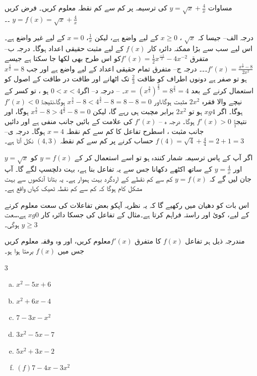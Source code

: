 مساوات \( y=\sqrt{x}+\frac{4}{x} \) کی ترسیمہ پر کم سے کم نقطہ معلوم کریں۔
فرض کریں \( y=f(x)=\sqrt{x}+\frac{4}{x} \)		۔۔

درجہ الف-- جیسا کہ $ \sqrt{x}$		،	  $ x\geq0$	کے لیے واضع ہے، لیکن 	$ \frac{1}{x} $،	  $x=0 $	کے لیے غیر واضع ہے۔ اس لیے سب سے بڑا ممکنہ دائرہ کار 	   \(f(x)\)   	کے لیے مثبت حقیقی اعداد ہوگا۔
درجہ ب--متفرق	$ f'(x)=\frac{1}{2} x^{\frac{-1}{2}} -4x^{-2}$کو اس طرح بھی لکھا جا سکتا ہے جیسے  $f'(x)=\frac{x^{\frac{3}{2}}-8}{2x^{2}} $۔۔۔
درجہ ج-- متفرق تمام حقیقی اعداد کے لیے واضع ہے اور جب $ x^{\frac{3}{2}}=8 $ ہو تو صفر ہے دونوں اطراف کو طاقت  $\frac{2}{3} $		 تک اٹھانے اور طاقت در طاقت کے اصول کو استعمال کرنے کے بعد    $ x=(x^{\frac{3}{2}})^{\frac{2}{3}}=8^{\frac{2}{3}}=4 $۔
--
درجہ د-- اگر$ 0<x<4 $ ہو ، تو کسر کے نیچے والا فقرہ 	   $2x^{2} $	مثبت ہوگا،اور    $x^{\frac{3}{2}}-8<4^{\frac{3}{2}}-8=8-8=0 $   ہوگا،نتیجۃً	 $f'(x)<0 $	ہوگا۔ 
اگر 	\( xg4\) ہو تو 	$2x^{2} $ برابر مچبت ہی رہے گا، لیکن $x^{\frac{3}{2}}-8>4^{\frac{3}{2}}-8=0 $ ہوگا، اور نتیجۃًٍٍ \( f'(x)>0 \) ہوگا۔
درجہ ہ --  \(f\prime(x)\) کی علامت   کے بائیں جانب منفی ہے اور دائیں جانب مثبت ، اسطرح تفاعل کا کم سے کم نقطہ $ x=4 $  ہوگا۔
درجہ ی-- 		 $ f(4)=\sqrt{4}+\frac{4}{4}=2+1=3 $	حساب کرنے پر کم سے کم نقطہ 	\(  (4,3)\)	 نکل آتا ہے۔

اگر آپ کے پاس ترسیمہ شمار کنندہ ہو تو اسے استعمال کر کے \(y=f(x) \) کو  \(y=\sqrt{x} \) اور  \(y=\frac{4}{x} \)  کے ساتھ اکٹھے دکھانا جس سے یہ تفاعل بنا ہے، بہت دلچسپ لگے گا۔ آپ جان لیں گے کہ \(y=f(x) \)  کم سے کم نقطے کے اردگرد بہت ہموار ہے۔ یہ بتانا آنکھوں سے بہت مشکل کام ہوگا کہ کم سے کم نقطہ ٹھیک کہاں واقع ہے۔

اس بات کو دھیان میں رکھیے گا کہ یہ نظریہ آپکو بعض تفاعلات کی سعت معلوم کرنے کے لیے، کوئ اور راستہ فراہم کرتا ہے۔مثال  کے تفاعل کی جسکا دائرہ کار 	\( xg0\)	 ہے،سعت 	\( y\ge 3\) ہوگی۔

مندرجہ ذیل ہر تفاعل 	\(f(x)\) 	کا متفرق \( f\prime (x)\)معلوم کریں، اور وہ وقفہ معلوم کریں جس میں 		  \(f(x)\)   برھتا ہوا ہو۔ 
\begin{multicols}{3}
\begin{enumerate}[a.]
\item \(x^{2}-5x+6 \hspace{50pt}\)
\item  \(x^{2}+6x-4 \hspace{50pt}\)
\item   \(7-3x-x^{2} \)
\item    \(3x^{2}-5x-7 \hspace{50pt}\)
\item     \(5x^{2}+3x-2 \hspace{50pt}\)
\item      \((f)7-4x-3x^{2}\)
\end{enumerate}
\end{multicols}

